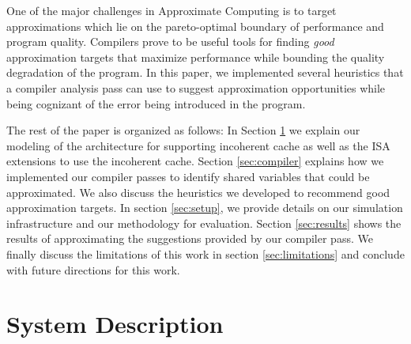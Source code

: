 \documentclass[12pt,conference]{IEEEtran}
\begin{document}
One of the major challenges in Approximate Computing is 
to target approximations which lie on the pareto-optimal
boundary of performance and program quality. Compilers prove
to be useful tools for finding \emph{good} approximation 
targets that maximize performance while bounding the
quality degradation of the program. In this paper, we implemented several 
heuristics that a compiler analysis pass can use to suggest approximation
opportunities while being cognizant of the error being introduced in the
program. 

The rest of the paper is organized as follows: In Section \ref{sec:system} we explain our 
modeling of the architecture for supporting incoherent cache as well as the
ISA extensions to use the incoherent cache. Section \ref{sec:compiler} explains how we implemented
our compiler passes to identify shared variables that could be 
approximated. We also discuss the heuristics we developed to recommend good 
approximation targets. In section \ref{sec:setup}, we provide details on our 
simulation infrastructure and our methodology for evaluation. Section \ref{sec:results}
shows the results of approximating the suggestions provided by our compiler pass.
We finally discuss the limitations of this work in section \ref{sec:limitations}
and conclude with future directions for this work.

\section{System Description} \label{sec:system}
\end{document}
